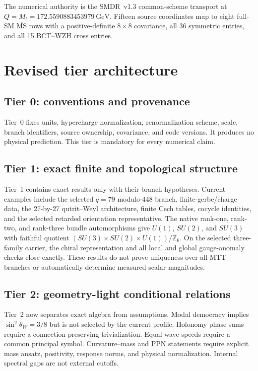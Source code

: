 \documentclass[11pt]{article}
\begin{document}
The numerical authority is the SMDR~v1.3 common-scheme transport at
$Q=M_t=172.5590883453979~\mathrm{GeV}$. Fifteen source coordinates map to eight
full-SM $\overline{\mathrm{MS}}$ rows with a positive-definite $8\times8$
covariance, all 36 symmetric entries, and all 15 BCT--WZH cross entries.

\section{Revised tier architecture}

\subsection{Tier 0: conventions and provenance}

Tier~0 fixes units, hypercharge normalization, renormalization scheme, scale,
branch identifiers, source ownership, covariance, and code versions. It
produces no physical prediction. This tier is mandatory for every numerical
claim.

\subsection{Tier 1: exact finite and topological structure}

Tier~1 contains exact results only with their branch hypotheses. Current
examples include the selected $q=79$ modulo-448 branch, finite-gerbe/charge
data, the 27-by-27 qutrit--Weyl architecture, finite Cech tables, cocycle
identities, and the selected retarded orientation representative. The native
rank-one, rank-two, and rank-three bundle automorphisms give
$U(1)$, $SU(2)$, and $SU(3)$ with faithful quotient
$(SU(3)\times SU(2)\times U(1))/\mathbb Z_6$. On the selected
three-family carrier, the chiral representation and all local and global
gauge-anomaly checks close exactly. These results do not prove uniqueness over
all MTT branches or automatically determine measured scalar magnitudes.

\subsection{Tier 2: geometry-light conditional relations}

Tier~2 now separates exact algebra from assumptions. Modal democracy implies
$\sin^2\theta_W=3/8$ but is not selected by the current profile. Holonomy phase
sums require a connection-preserving trivialization. Equal wave speeds require
a common principal symbol. Curvature--mass and PPN statements require explicit
mass ansatz, positivity, response norms, and physical normalization. Internal
spectral gaps are not external cutoffs.
\end{document}
